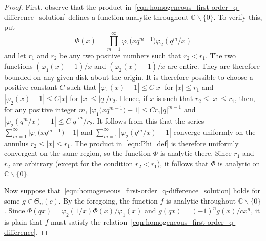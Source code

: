 \documentclass[pdftex]{sigma}
\numberwithin{equation}{section}
\newcommand{\C}{\mathbb{C}}
\begin{document}
\begin{proof}
First, observe that the product in~\eqref{eqn:homogeneous_first-order_q-difference_solution} defines a function analytic throughout $\C\backslash\{0\}$. To verify this, put
\begin{equation} \label{eqn:Phi_def}
\Phi(x) = \prod_{m=1}^\infty \varphi_1\bigl(xq^{m-1}\bigr) \varphi_2(q^m/x)
\end{equation}
and let $r_1$ and $r_2$ be any two positive numbers such that $r_2 < r_1$. The two functions $(\varphi_1(x)-1)/x$ and $(\varphi_2(x)-1)/x$ are entire. They are therefore bounded on any given disk about the origin. It is therefore possible to choose a positive constant $C$ such that $|\varphi_1(x)-1| \leq C|x|$ for $|x| \leq r_1$ and $|\varphi_2(x)-1| \leq C|x|$ for $|x| \leq |q|/r_2$. Hence, if $x$ is such that $r_2 \leq |x| \leq r_1$, then, for any positive integer $m$,
$\big| \varphi_1\bigl(xq^{m-1}\bigr) - 1 \big| \leq Cr_1|q|^{m-1}$ and $|\varphi_2(q^m/x) - 1| \leq C|q|^m/r_2$.
It follows from this that the series $\sum_{m=1}^\infty \big|\varphi_1\bigl(xq^{m-1}\bigr) - 1\big|$ and $\sum_{m=1}^\infty |\varphi_2(q^m/x) - 1|$ converge uniformly on the annulus $r_2 \leq |x| \leq r_1$. The product in~\eqref{eqn:Phi_def} is therefore uniformly convergent on the same region, so the function $\Phi$ is analytic there. Since $r_1$ and $r_2$ are arbitrary (except for the condition $r_2<r_1$), it follows that $\Phi$ is analytic on $\C\backslash\{0\}$.

Now suppose that~\eqref{eqn:homogeneous_first-order_q-difference_solution} holds for some $g \in \Theta_n(c)$. By the foregoing, the function $f$ is analytic throughout $\C\backslash\{0\}$. Since $\Phi(qx) = \varphi_2(1/x) \Phi(x) / \varphi_1(x)$ and $g(qx) = (-1)^n g(x)/cx^n$, it is plain that $f$ must satisfy the relation~\eqref{eqn:homogeneous_first-order_q-difference}.


\end{proof}
\end{document}
